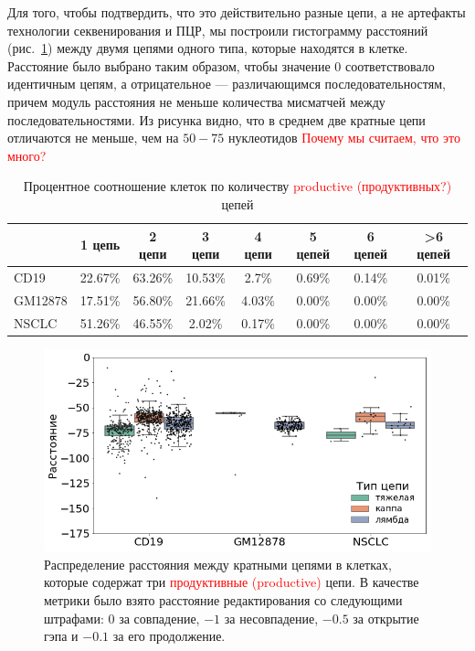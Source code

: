 \documentclass{spbau-diploma}
\newcommand{\todo}{\textcolor{red}}
\begin{document}
Для того, чтобы подтвердить, что это действительно разные цепи, а не артефакты технологии секвенирования и ПЦР, мы построили гистограмму расстояний (рис.~\ref{d_distribution}) между двумя цепями одного типа, которые находятся в клетке.
Расстояние было выбрано таким образом, чтобы значение $0$ соответствовало идентичным цепям, а отрицательное --- различающимся последовательностям, причем модуль расстояния не меньше количества мисматчей между последовательностями.
Из рисунка видно, что в среднем две кратные цепи отличаются не меньше, чем на $50-75$ нуклеотидов \todo{Почему мы считаем, что это много? }


\begin{table}[h!]
\centering
\begin{tabular}{|l|c|c|c|c|c|c|c|}
\hline
        & \textbf{1 цепь} & \textbf{2 цепи} & \textbf{3 цепи} & \textbf{4 цепи} & \textbf{5 цепей} & \textbf{6 цепей} & \textbf{\textgreater{}6 цепей} \\ \hline
CD19    & 22.67\%         & 63.26\%         & 10.53\%         & 2.7\%           & 0.69\%           & 0.14\%           & 0.01\%                         \\ \hline
GM12878 & 17.51\%         & 56.80\%         & 21.66\%         & 4.03\%          & 0.00\%           & 0.00\%           & 0.00\%                         \\ \hline
NSCLC   & 51.26\%         & 46.55\%         & 2.02\%          & 0.17\%          & 0.00\%           & 0.00\%           & 0.00\%                         \\ \hline
\end{tabular}
\caption{Процентное соотношение клеток по количеству \todo{productive (продуктивных?)} цепей}
\label{stats_nchains}
\end{table}

 
\begin{figure}[h]
    \centering
    \includegraphics[width=1.\textwidth]{figures/d_distribution.png}
    \caption{Распределение расстояния между кратными цепями в клетках, которые содержат три \todo{продуктивные (productive)} цепи.  
    В качестве метрики было взято расстояние редактирования со следующими штрафами: $0$ за совпадение, $-1$ за несовпадение, $-0.5$ за открытие гэпа и $-0.1$ за его продолжение.}
    \label{d_distribution}
\end{figure}
\end{document}
